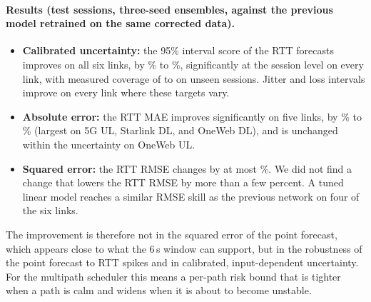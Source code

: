 \paragraph{Results (test sessions, three-seed ensembles, against the previous model retrained on the same corrected data).}
\begin{itemize}[leftmargin=*]
  \item \textbf{Calibrated uncertainty:} the 95\% interval score of the RTT forecasts improves on all six links, by \BSISWorstAbs\% to \BSISBestAbs\%, significantly at the session level on every link, with measured coverage of \PICPEnsMin{} to \PICPEnsMax{} on unseen sessions. Jitter and loss intervals improve on every link where these targets vary.
  \item \textbf{Absolute error:} the RTT MAE improves significantly on five links, by \BSMAEsigLoAbs\% to \BSMAEsigHiAbs\% (largest on 5G UL, Starlink DL, and OneWeb DL), and is unchanged within the uncertainty on OneWeb UL.
  \item \textbf{Squared error:} the RTT RMSE changes by at most \BSRMSEMaxAbs\%. We did not find a change that lowers the RTT RMSE by more than a few percent. A tuned linear model reaches a similar RMSE skill as the previous network on four of the six links.
\end{itemize}
The improvement is therefore not in the squared error of the point forecast, which appears close to what the 6\,s window can support, but in the robustness of the point forecast to RTT spikes and in calibrated, input-dependent uncertainty. For the multipath scheduler this means a per-path risk bound that is tighter when a path is calm and widens when it is about to become unstable.

